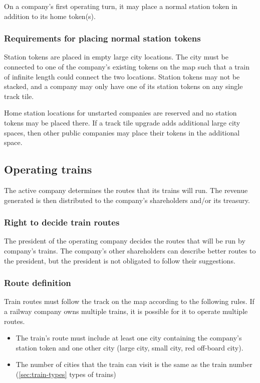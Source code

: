 \documentclass{article}
\begin{document}
\begin{CJK}{UTF8}{min}
\begin{multicols}{2}
On a company's first operating turn, it may place a normal station
token in addition to its home token(s).

\subsubsection{Requirements for placing normal station tokens}
Station tokens are placed in empty large city locations. The city must
be connected to one of the company's existing tokens on the map such
that a train of infinite length could connect the two
locations. Station tokens may not be stacked, and a company may only
have one of its station tokens on any single track tile.

Home station locations for unstarted companies are reserved and no
station tokens may be placed there. If a track tile upgrade adds
additional large city spaces, then other public companies may place
their tokens in the additional space.

\subsection{Operating trains}
The active company determines the routes that its trains will run. The
revenue generated is then distributed to the company's shareholders
and/or its treasury.

\subsubsection{Right to decide train routes}
The president of the operating company decides the routes that will be
run by company's trains. The company's other shareholders can describe
better routes to the president, but the president is not obligated to
follow their suggestions.

\subsubsection{Route definition}
Train routes must follow the track on the map according to the
following rules. If a railway company owns multiple trains, it is
possible for it to operate multiple routes.
\begin{itemize}
\item The train's route must include at least one city containing the
  company's station token and one other city (large city, small city,
  red off-board city).

\item The number of cities that the train can visit is the same as the
  train number (\autoref{sec:train-types} types of trains)


\end{itemize}
\end{multicols}
\end{CJK}
\end{document}
